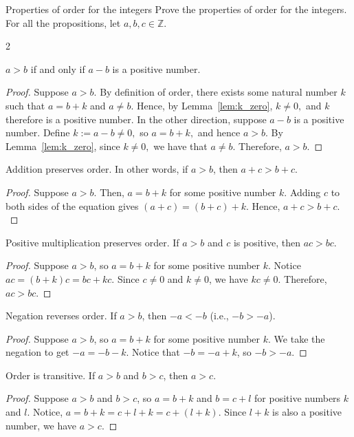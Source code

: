 \begin{problem}{Properties of order for the integers}
	Prove the properties of order for the integers. For all the propositions, let $a, b, c \in \mathbb{Z}.$
\end{problem}
\begin{multicols}{2}
\begin{proposition}
	$a > b$  if and only if $a - b$ is a positive number.
\end{proposition}
\begin{proof}
	Suppose $a > b.$
	By definition of order, there exists some natural number $k$ such that $a = b + k$ and $a \neq b.$ 
	Hence, by Lemma~\ref{lem:k_zero}, $k \neq 0,$ and $k$ therefore is a positive number.
	In the other direction, suppose $a - b$ is a positive number.
	Define $k := a - b \neq 0,$ so $a = b + k,$ and hence $a > b.$ 
	By Lemma~\ref{lem:k_zero}, since $k \neq 0,$ we have that $a \neq b.$
	Therefore, $a > b.$
\end{proof}
\begin{proposition}
	Addition preserves order. In other words, if $a > b$, then $a + c > b + c.$
\end{proposition}

\begin{proof}
	Suppose $a > b.$ Then, $a = b + k$ for some positive number $k.$ 
	Adding $c$ to both sides of the equation gives $(a + c) = (b + c) + k.$ 
	Hence, $a + c > b + c.$
\end{proof}

\begin{proposition}
	Positive multiplication preserves order. If $a > b$ and $c$ is positive, then $ac > bc.$
\end{proposition}
\begin{proof}
	Suppose $a > b$, so $a = b +k$ for some positive number $k$.
	Notice $ac = (b + k)c = bc + kc.$ 
	Since $c \neq 0$ and $k \neq 0$, we have $kc \neq 0.$ 
	Therefore, $ac > bc.$
\end{proof}

\begin{proposition}
	Negation reverses order. If $a > b$, then $-a < -b$ (i.e., $-b > -a$).
\end{proposition}
\begin{proof}
	Suppose $a > b$, so $a = b + k$ for some positive number $k.$ 
	We take the negation to get $-a = -b -k.$
	Notice that $-b = -a + k$, so $-b > -a.$
\end{proof}

\begin{proposition}
	Order is transitive. If $a > b$ and $b > c$, then $a > c.$
\end{proposition}
\begin{proof}
	Suppose $a > b$ and $b > c$, so $a = b + k$ and $b = c + l$ for positive numbers $k$ and $l$.
	Notice, $a = b +k = c + l + k = c + (l + k).$
	Since $l + k$ is also a positive number, we have $a > c.$
\end{proof}


\end{multicols}
